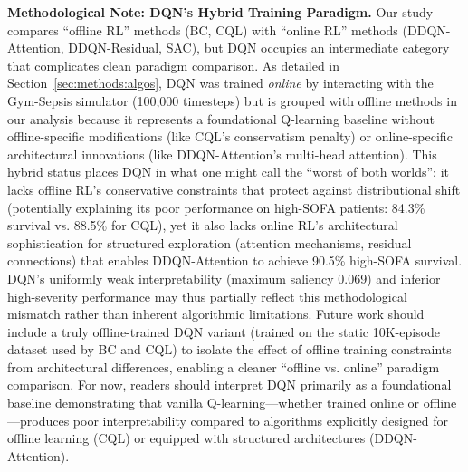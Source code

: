 \textbf{Methodological Note: DQN's Hybrid Training Paradigm.} Our study compares ``offline RL'' methods (BC, CQL) with ``online RL'' methods (DDQN-Attention, DDQN-Residual, SAC), but DQN occupies an intermediate category that complicates clean paradigm comparison. As detailed in Section~\ref{sec:methods:algos}, DQN was trained \textit{online} by interacting with the Gym-Sepsis simulator (100,000 timesteps) but is grouped with offline methods in our analysis because it represents a foundational Q-learning baseline without offline-specific modifications (like CQL's conservatism penalty) or online-specific architectural innovations (like DDQN-Attention's multi-head attention). This hybrid status places DQN in what one might call the ``worst of both worlds'': it lacks offline RL's conservative constraints that protect against distributional shift (potentially explaining its poor performance on high-SOFA patients: 84.3\% survival vs. 88.5\% for CQL), yet it also lacks online RL's architectural sophistication for structured exploration (attention mechanisms, residual connections) that enables DDQN-Attention to achieve 90.5\% high-SOFA survival. DQN's uniformly weak interpretability (maximum saliency 0.069) and inferior high-severity performance may thus partially reflect this methodological mismatch rather than inherent algorithmic limitations. Future work should include a truly offline-trained DQN variant (trained on the static 10K-episode dataset used by BC and CQL) to isolate the effect of offline training constraints from architectural differences, enabling a cleaner ``offline vs. online'' paradigm comparison. For now, readers should interpret DQN primarily as a foundational baseline demonstrating that vanilla Q-learning—whether trained online or offline—produces poor interpretability compared to algorithms explicitly designed for offline learning (CQL) or equipped with structured architectures (DDQN-Attention).

